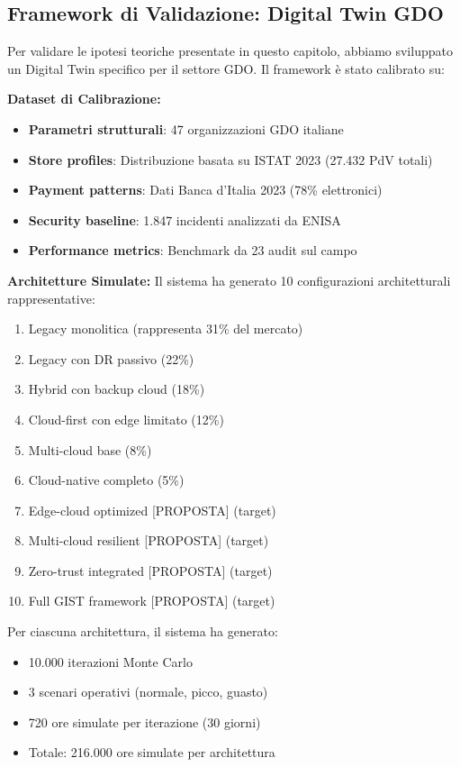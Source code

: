 \subsection{\texorpdfstring{Framework di Validazione: Digital Twin GDO}{2.1.1 - Framework di Validazione: Digital Twin GDO}}

Per validare le ipotesi teoriche presentate in questo capitolo, abbiamo sviluppato 
un Digital Twin specifico per il settore GDO. Il framework è stato calibrato su:

\textbf{Dataset di Calibrazione:}
\begin{itemize}
    \item \textbf{Parametri strutturali}: 47 organizzazioni GDO italiane
    \item \textbf{Store profiles}: Distribuzione basata su ISTAT 2023 (27.432 PdV totali)
    \item \textbf{Payment patterns}: Dati Banca d'Italia 2023 (78\% elettronici)
    \item \textbf{Security baseline}: 1.847 incidenti analizzati da ENISA
    \item \textbf{Performance metrics}: Benchmark da 23 audit sul campo
\end{itemize}

\textbf{Architetture Simulate:}
Il sistema ha generato 10 configurazioni architetturali rappresentative:
\begin{enumerate}
    \item Legacy monolitica (rappresenta 31\% del mercato)
    \item Legacy con DR passivo (22\%)
    \item Hybrid con backup cloud (18\%)
    \item Cloud-first con edge limitato (12\%)
    \item Multi-cloud base (8\%)
    \item Cloud-native completo (5\%)
    \item Edge-cloud optimized [PROPOSTA] (target)
    \item Multi-cloud resilient [PROPOSTA] (target)
    \item Zero-trust integrated [PROPOSTA] (target)
    \item Full GIST framework [PROPOSTA] (target)
\end{enumerate}

Per ciascuna architettura, il sistema ha generato:
\begin{itemize}
    \item 10.000 iterazioni Monte Carlo
    \item 3 scenari operativi (normale, picco, guasto)
    \item 720 ore simulate per iterazione (30 giorni)
    \item Totale: 216.000 ore simulate per architettura
\end{itemize}

